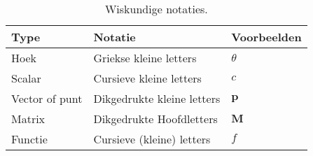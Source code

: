 \begin{table}
  \begin{tabular}{@{}lll@{}}\toprule
    Type           & Notatie                    & Voorbeelden  \\ \midrule
    Hoek           & Griekse kleine letters     & $\theta$     \\
    Scalar         & Cursieve kleine letters    & $\mathit{c}$ \\
    Vector of punt & Dikgedrukte kleine letters & $\mathbf{p}$ \\
    Matrix         & Dikgedrukte Hoofdletters   & $\mathbf{M}$ \\
    Functie        & Cursieve (kleine) letters  & $\mathit{f}$ \\ \bottomrule
  \end{tabular}
  \caption{Wiskundige notaties.}
  \label{tbl:math-notaties}
\end{table}

